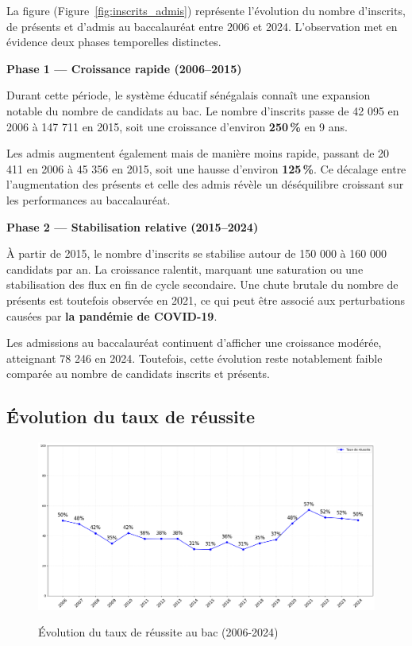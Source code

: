 La figure (Figure~\ref{fig:inscrits_admis}) représente l’évolution du nombre d’inscrits, de présents et d’admis au baccalauréat entre 2006 et 2024. 
L’observation met en évidence deux phases temporelles distinctes.

\textbf{Phase 1 — Croissance rapide (2006–2015)}  

Durant cette période, le système éducatif sénégalais connaît une expansion notable du nombre de candidats au bac. 
Le nombre d’inscrits passe de 42 095 en 2006 à 147 711 en 2015, soit une croissance d’environ \textbf{250\,\%} en 9 ans.

Les admis augmentent également mais de manière moins rapide, passant de 20 411 en 2006 à 45 356 en 2015, soit une hausse d’environ \textbf{125\,\%}. 
Ce décalage entre l’augmentation des présents et celle des admis révèle un déséquilibre croissant sur les performances au baccalauréat.

\textbf{Phase 2 — Stabilisation relative (2015–2024)}  

À partir de 2015, le nombre d’inscrits se stabilise autour de 150 000 à 160 000 candidats par an. 
La croissance ralentit, marquant une saturation ou une stabilisation des flux en fin de cycle secondaire. 
Une chute brutale du nombre de présents est toutefois observée en 2021, ce qui peut être associé aux perturbations causées par \textbf{la pandémie de COVID-19}.

Les admissions au baccalauréat continuent d'afficher une croissance modérée, atteignant 78 246 en 2024. Toutefois, cette évolution reste notablement faible comparée au nombre de candidats inscrits et présents.

\subsection{Évolution du taux de réussite}

\begin{figure}[ht]
\centering
\caption{Évolution du taux de réussite au bac (2006-2024)}
\includegraphics[width=1\textwidth]{figure/taux_bac.png}
\label{fig:taux_reussite}
\end{figure}

